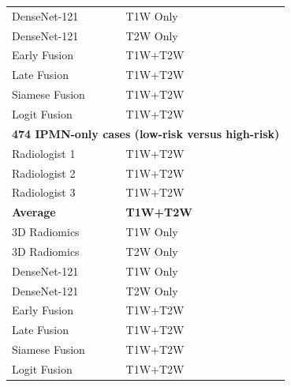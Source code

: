 \begin{table}[tb]
\begin{center}
\begin{small}
{\begin{tabular}{ll|ll|ll}
\hline
\rowcolor{g3}\color{blue}DenseNet-121&\color{blue}T1W Only&\color{blue}&\color{blue}&\color{blue}&\color{blue}\\
\rowcolor{g3}\color{blue}DenseNet-121&\color{blue}T2W Only&\color{blue}&\color{blue}&\color{blue}&\color{blue}\\%
\rowcolor{g3}\color{blue}Early Fusion&\color{blue}T1W+T2W&\color{blue}&\color{blue}&\color{blue}&\color{blue}\\
\rowcolor{g3}\color{blue}Late Fusion&\color{blue}T1W+T2W&\color{blue}&\color{blue}&\color{blue}&\color{blue}\\
\rowcolor{g3}\color{blue}Siamese Fusion&\color{blue}T1W+T2W&\color{blue}&\color{blue}&\color{blue}&\color{blue}\\
\rowcolor{g3}\color{blue}Logit Fusion&\color{blue}T1W+T2W&\color{blue}&\color{blue}&\color{blue}&\color{blue}\\
\midrule
\multicolumn{6}{l}{\color{blue}\textbf{474 IPMN-only cases (low-risk versus high-risk)}}\\
\hline
\rowcolor{g2}\color{blue}Radiologist 1&\color{blue}T1W+T2W&\color{blue}&\color{blue}&\color{blue}&\color{blue}\\
\rowcolor{g2}\color{blue}Radiologist 2&\color{blue}T1W+T2W&\color{blue}&\color{blue}&\color{blue}&\color{blue}\\
\rowcolor{g2}\color{blue}Radiologist 3&\color{blue}T1W+T2W&\color{blue}&\color{blue}&\color{blue}&\color{blue}\\
\rowcolor{g2}\color{blue}\bf{Average}&\color{blue}\bf{T1W+T2W}&\color{blue}&\color{blue}&\color{blue}&\color{blue}\\
\hline
\rowcolor{g3}\color{blue}3D Radiomics&\color{blue}T1W Only&\color{blue}&\color{blue}&\color{blue}&\color{blue}\\
\rowcolor{g3}\color{blue}3D Radiomics&\color{blue}T2W Only&\color{blue}&\color{blue}&\color{blue}&\color{blue}\\
\hline
\rowcolor{g3}\color{blue}DenseNet-121&\color{blue}T1W Only&\color{blue}&\color{blue}&\color{blue}&\color{blue}\\
\rowcolor{g3}\color{blue}DenseNet-121&\color{blue}T2W Only &\color{blue}&\color{blue}&\color{blue}&\color{blue}\\%
\rowcolor{g3}\color{blue}Early Fusion&\color{blue}T1W+T2W&\color{blue}&\color{blue}&\color{blue}&\color{blue}\\
\rowcolor{g3}\color{blue}Late Fusion&\color{blue}T1W+T2W&\color{blue}&\color{blue}&\color{blue}&\color{blue}\\
\rowcolor{g3}\color{blue}Siamese Fusion&\color{blue}T1W+T2W&\color{blue}&\color{blue}&\color{blue}&\color{blue}\\
\rowcolor{g3}\color{blue}Logit Fusion&\color{blue}T1W+T2W&\color{blue}&\color{blue}&\color{blue}&\color{blue}\\
\midrule


\end{tabular}}
\end{small}
\end{center}
\end{table}
